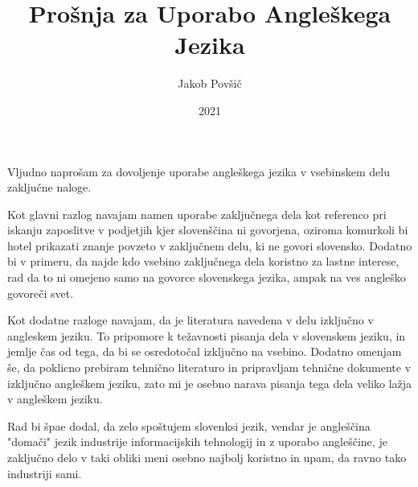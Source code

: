 \documentclass[12p]{article}
\title{Prošnja za Uporabo Angleškega Jezika}
\author{Jakob Povšič}
\date{2021}
\begin{document}
\maketitle
Vljudno naprošam za dovoljenje uporabe angleškega jezika v vsebinskem delu zaključne naloge.

Kot glavni razlog navajam namen uporabe zaključnega dela kot referenco pri iskanju zaposlitve v podjetjih kjer slovenščina ni govorjena, oziroma komurkoli bi hotel prikazati znanje povzeto v zaključnem delu, ki ne govori slovensko.
Dodatno bi v primeru, da najde kdo vsebino zaključnega dela koristno za lastne interese, rad da to ni omejeno samo na govorce slovenskega jezika, ampak na ves angleško govoreči svet.

Kot dodatne razloge navajam, da je literatura navedena v delu izključno v angleskem jeziku.
To pripomore k težavnosti pisanja dela v slovenskem jeziku, in jemlje čas od tega, da bi se osredotočal izključno na vsebino.
Dodatno omenjam še, da poklicno prebiram tehnično literaturo in pripravljam tehnične dokumente v izključno angleškem jeziku, zato mi je osebno narava pisanja tega dela veliko lažja v angleškem jeziku.

Rad bi špae dodal, da zelo spoštujem slovenksi jezik, vendar je angleščina "domači" jezik industrije informacijskih tehnologij in z uporabo angleščine, je zaključno delo v taki obliki meni osebno najbolj koristno in upam, da ravno tako industriji sami.
\end{document}

